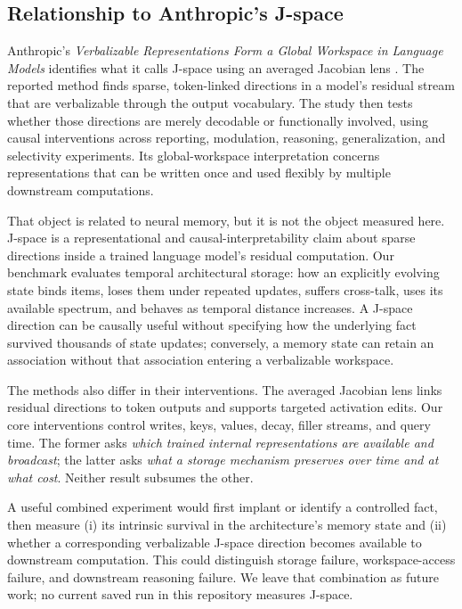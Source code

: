 \documentclass[10pt,twocolumn]{article}
\begin{document}
\subsection{Relationship to Anthropic's J-space}
\label{sec:jspace}

Anthropic's \emph{Verbalizable Representations Form a Global Workspace in
Language Models} identifies what it calls J-space using an averaged Jacobian
lens \cite{anthropic2026jspace}.  The reported method finds sparse,
token-linked directions in a model's residual stream that are verbalizable
through the output vocabulary.  The study then tests whether those directions
are merely decodable or functionally involved, using causal interventions
across reporting, modulation, reasoning, generalization, and selectivity
experiments.  Its global-workspace interpretation concerns representations
that can be written once and used flexibly by multiple downstream
computations.

That object is related to neural memory, but it is not the object measured
here.  J-space is a representational and causal-interpretability claim about
sparse directions inside a trained language model's residual computation.
Our benchmark evaluates temporal architectural storage: how an explicitly
evolving state binds items, loses them under repeated updates, suffers
cross-talk, uses its available spectrum, and behaves as temporal distance
increases.  A J-space direction can be causally useful without specifying how
the underlying fact survived thousands of state updates; conversely, a memory
state can retain an association without that association entering a
verbalizable workspace.

The methods also differ in their interventions.  The averaged Jacobian lens
links residual directions to token outputs and supports targeted activation
edits.  Our core interventions control writes, keys, values, decay, filler
streams, and query time.  The former asks \emph{which trained internal
representations are available and broadcast}; the latter asks \emph{what a
storage mechanism preserves over time and at what cost}.  Neither result
subsumes the other.

A useful combined experiment would first implant or identify a controlled
fact, then measure (i) its intrinsic survival in the architecture's memory
state and (ii) whether a corresponding verbalizable J-space direction becomes
available to downstream computation.  This could distinguish storage failure,
workspace-access failure, and downstream reasoning failure.  We leave that
combination as future work; no current saved run in this repository measures
J-space.
\end{document}
